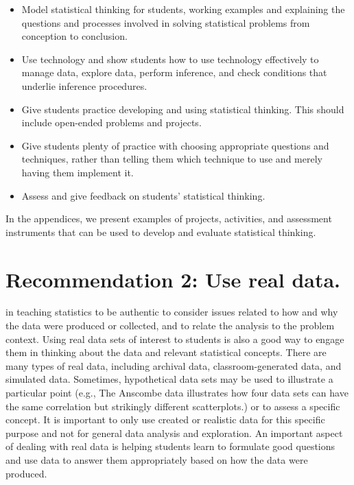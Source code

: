 \renewcommand\labelitemi{$\checkmark$}

\begin{itemize}[leftmargin=1cm, itemsep=.2em]
\item Model statistical thinking for students, working examples and explaining the questions and processes involved in solving statistical problems from conception to conclusion.
\item Use technology and show students how to use technology effectively to manage data, explore data, perform inference, and check conditions that underlie inference procedures.
\item Give students practice developing and using statistical thinking.  This should include open-ended problems and projects.
\item Give students plenty of practice with choosing appropriate questions and techniques, rather than telling them which technique to use and merely having them implement it.
\item Assess and give feedback on students' statistical thinking.
\end{itemize}
 
In the appendices, we present examples of projects, activities, and assessment instruments that can be used to develop and evaluate statistical thinking.

\section{\textbf{Recommendation 2: Use real data.}}
 
 in teaching statistics to be authentic to consider issues related to how and why the data were produced or collected, and to relate the analysis to the problem context. Using real data sets of interest to students is also a good way to engage them in thinking about the data and relevant statistical concepts. There are many types of real data, including archival data, classroom-generated data, and simulated data. Sometimes, hypothetical data sets may be used to illustrate a particular point  (e.g., The Anscombe data illustrates how four data sets can have the same correlation but strikingly different scatterplots.) or to assess a specific concept. It is important to only use created or realistic data for this specific purpose and not for general data analysis and exploration. An important aspect of dealing with real data is helping students learn to formulate good questions and use data to answer them appropriately based on how the data were produced. 


